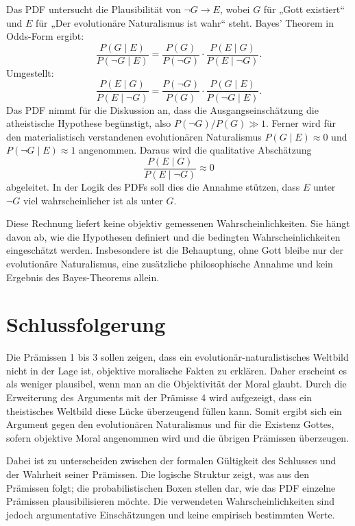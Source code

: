 \documentclass[11pt,a4paper]{article}
\begin{document}
	\begin{tcolorbox}[title=Mathematische Box: Bayes' Theorem und Prämisse (4)]
		Das PDF untersucht die Plausibilität von \(\neg G\rightarrow E\), wobei \(G\) für „Gott existiert“ und \(E\) für „Der evolutionäre Naturalismus ist wahr“ steht. Bayes' Theorem in Odds-Form ergibt:
		\[
		\frac{P(G\mid E)}{P(\neg G\mid E)}
		=
		\frac{P(G)}{P(\neg G)}
		\cdot
		\frac{P(E\mid G)}{P(E\mid\neg G)}.
		\]
		Umgestellt:
		\[
		\frac{P(E\mid G)}{P(E\mid\neg G)}
		=
		\frac{P(\neg G)}{P(G)}
		\cdot
		\frac{P(G\mid E)}{P(\neg G\mid E)}.
		\]
		Das PDF nimmt für die Diskussion an, dass die Ausgangseinschätzung die atheistische Hypothese begünstigt, also \(P(\neg G)/P(G)\gg 1\). Ferner wird für den materialistisch verstandenen evolutionären Naturalismus \(P(G\mid E)\approx 0\) und \(P(\neg G\mid E)\approx 1\) angenommen. Daraus wird die qualitative Abschätzung
		\[
		\frac{P(E\mid G)}{P(E\mid\neg G)}\approx 0
		\]
		abgeleitet. In der Logik des PDFs soll dies die Annahme stützen, dass \(E\) unter \(\neg G\) viel wahrscheinlicher ist als unter \(G\).
		
		Diese Rechnung liefert keine objektiv gemessenen Wahrscheinlichkeiten. Sie hängt davon ab, wie die Hypothesen definiert und die bedingten Wahrscheinlichkeiten eingeschätzt werden. Insbesondere ist die Behauptung, ohne Gott bleibe nur der evolutionäre Naturalismus, eine zusätzliche philosophische Annahme und kein Ergebnis des Bayes-Theorems allein.
	\end{tcolorbox}
	
	\section{Schlussfolgerung}
	
	Die Prämissen 1 bis 3 sollen zeigen, dass ein evolutionär-naturalistisches Weltbild nicht in der Lage ist, objektive moralische Fakten zu erklären. Daher erscheint es als weniger plausibel, wenn man an die Objektivität der Moral glaubt. Durch die Erweiterung des Arguments mit der Prämisse 4 wird aufgezeigt, dass ein theistisches Weltbild diese Lücke überzeugend füllen kann. Somit ergibt sich ein Argument gegen den evolutionären Naturalismus und für die Existenz Gottes, sofern objektive Moral angenommen wird und die übrigen Prämissen überzeugen.
	
	Dabei ist zu unterscheiden zwischen der formalen Gültigkeit des Schlusses und der Wahrheit seiner Prämissen. Die logische Struktur zeigt, was aus den Prämissen folgt; die probabilistischen Boxen stellen dar, wie das PDF einzelne Prämissen plausibilisieren möchte. Die verwendeten Wahrscheinlichkeiten sind jedoch argumentative Einschätzungen und keine empirisch bestimmten Werte.
	
\end{document}
